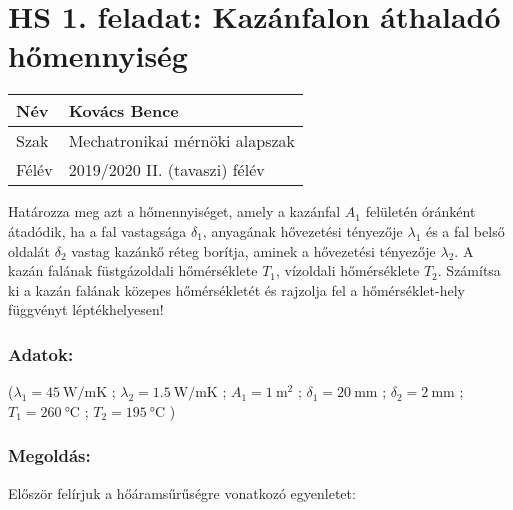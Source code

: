 
\section*{HS 1. feladat: Kazánfalon áthaladó hőmennyiség}


\begin{tabular}{ | p{2cm} | p{14cm} | } 
	\hline
	Név & Kovács Bence \\ 
	\hline
	Szak &  Mechatronikai mérnöki alapszak\\
	\hline
	Félév & 2019/2020 II. (tavaszi) félév \\ 
	\hline
\end{tabular}
\vspace{0.5cm}

Határozza meg azt a hőmennyiséget, amely a kazánfal $A_1$ felületén óránként átadódik, ha a fal vastagsága $\delta_1$, anyagának hővezetési tényezője $\lambda_1$ és a fal belső oldalát $\delta_2$ vastag kazánkő réteg borítja, aminek a hővezetési tényezője $\lambda_2$. A kazán falának füstgázoldali hőmérséklete $T_1$, vízoldali hőmérséklete $T_2$. Számítsa ki a kazán falának közepes hőmérsékletét és rajzolja fel a hőmérséklet-hely függvényt léptékhelyesen!
    \vspace{1mm}

\subsubsection*{Adatok:}
\vspace{1mm}

    ($\lambda_1 = \SI{45}{\watt\per\meter\K}$ ;
    $\lambda_2 = \SI{1.5}{\watt\per\meter\K}$ ;
    $A_1 = \SI{1}{\meter^2}$ ; 
    $\delta_1 = \SI{20}{\milli\meter}$ ; 
    $\delta_2 = \SI{2}{\milli\meter}$ ; 
    $T_1 = \SI{260}{\celsius}$ ; 
    $ T_2 = \SI{195}{\celsius}$ )
    \vspace{3mm}

\hline
\subsubsection*{Megoldás:}

Először felírjuk a hőáramsűrűségre vonatkozó egyenletet:

